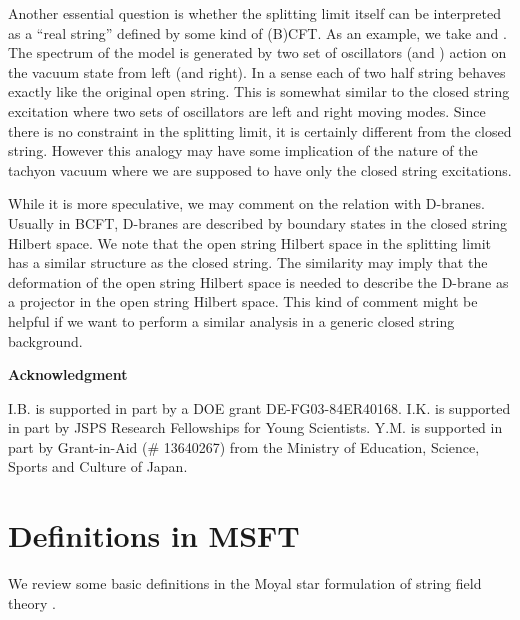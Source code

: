 \documentclass[a4paper,aps,preprint,nofootinbib,eqsecnum]{revtex4}
\begin{document}
Another essential question is whether the splitting limit itself
can be interpreted as a ``real string'' defined by some kind of
(B)CFT. As an example, we take \coordHE{} and \coordHE{}. The
spectrum of the model is generated by two set of oscillators
\coordHE{} (and \coordHE{}) action on the vacuum state from left
(and right). In a sense each of two half string behaves exactly
like the original open string. This is somewhat similar to the
closed string excitation where two sets of oscillators are left
and right moving modes. Since there is no \coordHE{}
constraint in the splitting limit, it is certainly different from
the closed string. However this analogy may have some implication
of the nature of the tachyon vacuum where we are supposed to have
only the closed string excitations.

While it is more speculative, we may comment on the relation with
D-branes. Usually in BCFT, D-branes are described by boundary
states in the closed string Hilbert space. We note that the open
string Hilbert space in the splitting limit has a similar
structure as the closed string. The similarity may imply that the
deformation of the open string Hilbert space is needed to describe
the D-brane as a projector in the open string Hilbert space. This
kind of comment might be helpful if we want to perform a similar
analysis in a generic closed string background.

\begin{center}
\textbf{Acknowledgment}
\end{center}

I.B. is supported in part by a DOE grant DE-FG03-84ER40168. I.K. is
supported in part by JSPS Research Fellowships for Young Scientists. Y.M. is
supported in part by Grant-in-Aid (\# 13640267) from the Ministry of
Education, Science, Sports and Culture of Japan.

\appendix

\section{Definitions in MSFT}

We review some basic definitions in the Moyal star formulation of
string field theory \cite{B,BM1,BM2,BKM1}.
\end{document}

